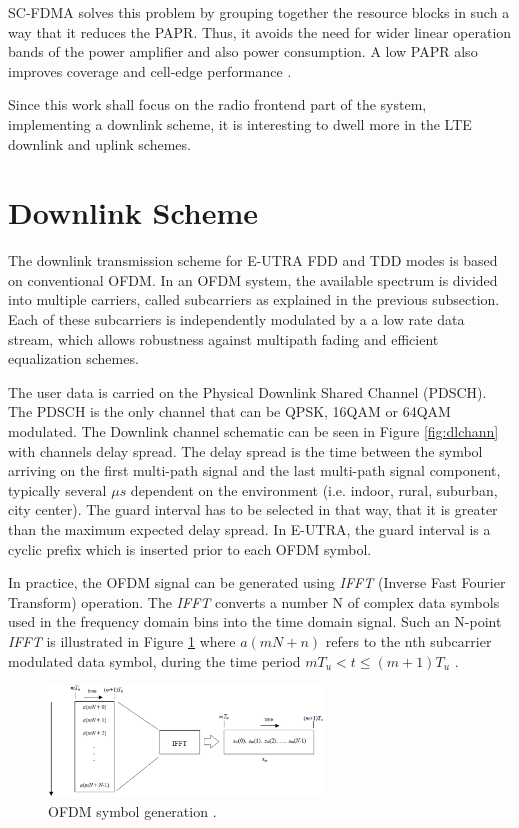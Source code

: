 SC-FDMA solves this problem by grouping together the resource blocks in such a
way that it reduces the PAPR. Thus, it avoids the need for wider linear
operation bands of the power amplifier and also power consumption. A low PAPR
also improves coverage and cell-edge performance \cite{introlte}.

Since this work shall focus on the radio frontend part of the system, implementing
a downlink scheme, it is interesting to dwell more in the LTE downlink and uplink
schemes.

\section{Downlink Scheme}%

The downlink transmission scheme for E-UTRA FDD and TDD modes is based on
conventional OFDM. In an OFDM system, the available spectrum is divided into
multiple carriers, called subcarriers as explained in the previous subsection.
Each of these subcarriers is independently modulated by a a low rate data
stream, which allows robustness against multipath fading and efficient
equalization schemes.

The user data is carried on the Physical Downlink Shared Channel (PDSCH). The
PDSCH is the only channel that can be QPSK, 16QAM or 64QAM modulated. The
Downlink channel schematic can be seen in Figure \ref{fig:dlchann} with channels
delay spread. The delay spread is the time between the symbol arriving on the
first multi-path signal and the last multi-path signal component, typically
several $\mu s$ dependent on the environment (i.e. indoor, rural, suburban, city
center). The guard interval has to be selected in that way, that it is greater
than the maximum expected delay spread. In E-UTRA, the guard interval is a
cyclic prefix which is inserted prior to each OFDM symbol.

In practice, the OFDM signal can be generated using \textit{IFFT} (Inverse Fast
Fourier Transform) operation. The \textit{IFFT} converts a number N of complex
data symbols used in the frequency domain bins into the time domain signal. Such
an N-point \textit{IFFT} is illustrated in Figure \ref{fig:ofdmsymbol} where
$a(mN+n)$ refers to the nth subcarrier modulated data symbol, during the time
period $mT_u < t \le (m+1)T_u$ \cite{umtslte}.

\begin{figure}[htbp]
    \centering
    \includegraphics[width=0.65\textwidth]{./figures/ofdm_symbol_gen}
    \caption{ OFDM symbol generation \cite{umtslte}.
    \label{fig:ofdmsymbol}}
\end{figure}

